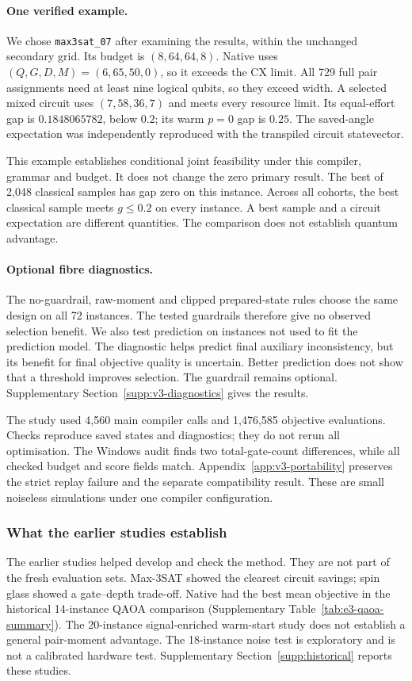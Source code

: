\documentclass[a4paper,onecolumn,11pt,unpublished]{quantumarticle}
\theoremstyle{remark}
\begin{document}
\paragraph{One verified example.}\label{par:v3-witness}
We chose \texttt{max3sat\_07} after examining the results, within the
unchanged secondary grid. Its budget is $(8,64,64,8)$.
Native uses $(Q,G,D,M)=(6,65,50,0)$, so it exceeds the CX limit.
All 729 full pair assignments need at least nine logical qubits, so they
exceed width. A selected mixed circuit uses $(7,58,36,7)$ and meets
every resource limit. Its equal-effort gap is $0.1848065782$, below $0.2$;
its warm $p=0$ gap is $0.25$. The saved-angle expectation was independently
reproduced with the transpiled circuit statevector.

This example establishes conditional joint feasibility under this compiler,
grammar and budget. It does not change the zero primary result.
The best of 2,048 classical samples has gap zero on this instance.
Across all cohorts, the best classical sample meets $g\leq0.2$ on every
instance. A best sample and a circuit expectation are different quantities.
The comparison does not establish quantum advantage.

\paragraph{Optional fibre diagnostics.}\label{sec:v3-guardrail}
The no-guardrail, raw-moment and clipped prepared-state rules choose the
same design on all 72 instances. The tested guardrails therefore give no
observed selection benefit. We also test prediction on instances not used
to fit the prediction model. The diagnostic helps predict final auxiliary
inconsistency, but its benefit for final objective quality is uncertain.
Better prediction does not show that a threshold improves selection.
The guardrail remains optional.
Supplementary Section~\ref{supp:v3-diagnostics} gives the results.

The study used 4,560 main compiler calls and 1,476,585 objective evaluations.
Checks reproduce saved states and diagnostics; they do not rerun all
optimisation. The Windows audit finds two total-gate-count differences,
while all checked budget and score fields match.
Appendix~\ref{app:v3-portability} preserves the strict replay failure and
the separate compatibility result. These are small noiseless simulations
under one compiler configuration.

\subsubsection{What the earlier studies establish}
The earlier studies helped develop and check the method. They are not part
of the fresh evaluation sets. Max-3SAT showed the clearest circuit savings;
spin glass showed a gate--depth trade-off. Native had the best mean objective
in the historical 14-instance QAOA comparison
(Supplementary Table~\ref{tab:e3-qaoa-summary}). The 20-instance signal-enriched
warm-start study does not establish a general pair-moment advantage.
The 18-instance noise test is exploratory and is not a calibrated hardware
test. Supplementary Section~\ref{supp:historical} reports these studies.
\end{document}
